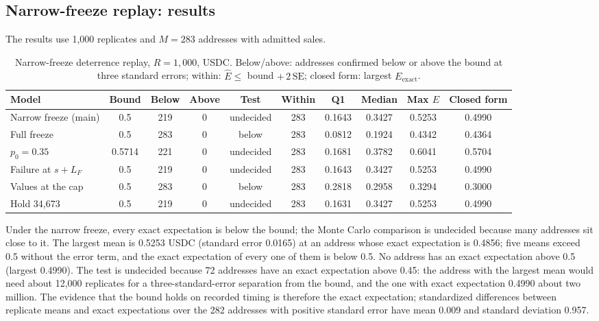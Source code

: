 \documentclass[10pt,a4paper]{article}
\theoremstyle{plain}
\theoremstyle{remark}
\begin{document}
\subsection{Narrow-freeze replay: results}
\label{sec:j7res}

The results use 1,000 replicates and $M=283$ addresses with admitted sales.

\begin{table}[!htbp]
\centering
\caption{Narrow-freeze deterrence replay, $R=1{,}000$, USDC. Below/above: addresses confirmed below or above the bound at three standard errors; within: $\hat E\le$ bound $+\,2\,\mathrm{SE}$; closed form: largest $E_{\mathrm{exact}}$.}
\label{tab:j7}
\footnotesize
\setlength{\tabcolsep}{3.5pt}
\begin{tabular}{@{}lccccccccc@{}}
\toprule
Model & Bound & Below & Above & Test & Within & Q1 & Median & Max $\hat E$ & Closed form \\
\midrule
Narrow freeze (main) & 0.5 & 219 & 0 & undecided & 283 & 0.1643 & 0.3427 & 0.5253 & 0.4990 \\
Full freeze & 0.5 & 283 & 0 & below & 283 & 0.0812 & 0.1924 & 0.4342 & 0.4364 \\
$p_0=0.35$ & 0.5714 & 221 & 0 & undecided & 283 & 0.1681 & 0.3782 & 0.6041 & 0.5704 \\
Failure at $s+L_F$ & 0.5 & 219 & 0 & undecided & 283 & 0.1643 & 0.3427 & 0.5253 & 0.4990 \\
Values at the cap & 0.5 & 283 & 0 & below & 283 & 0.2818 & 0.2958 & 0.3294 & 0.3000 \\
Hold 34,673 & 0.5 & 219 & 0 & undecided & 283 & 0.1631 & 0.3427 & 0.5253 & 0.4990 \\
\bottomrule
\end{tabular}
\end{table}

Under the narrow freeze, every exact expectation is below the bound; the Monte Carlo comparison is undecided because many addresses sit close to it. The largest mean is 0.5253 USDC (standard error 0.0165) at an address whose exact expectation is 0.4856; five means exceed 0.5 without the error term, and the exact expectation of every one of them is below 0.5. No address has an exact expectation above 0.5 (largest 0.4990). The test is undecided because 72 addresses have an exact expectation above 0.45: the address with the largest mean would need about 12,000 replicates for a three-standard-error separation from the bound, and the one with exact expectation 0.4990 about two million. The evidence that the bound holds on recorded timing is therefore the exact expectation; standardized differences between replicate means and exact expectations over the 282 addresses with positive standard error have mean 0.009 and standard deviation 0.957.
\end{document}
